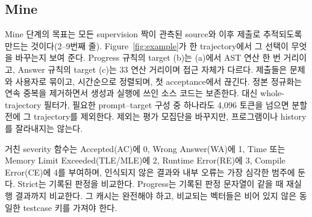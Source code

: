 \documentclass[10pt,conference]{IEEEtran}
\begin{document}
\subsection{Mine}
\label{sec:mine}

Mine 단계의 목표는 모든 supervision 짝이 관측된 source와 이후 제출로 추적되도록 만드는 것이다(2--9번째 줄). Figure~\ref{fig:example}가 한 trajectory에서 그 선택이 무엇을 바꾸는지 보여 준다. Progress 규칙의 target (b)는 (a)에서 AST 연산 한 번 거리이고, Answer 규칙의 target (c)는 33 연산 거리이며 접근 자체가 다르다. 제출들은 문제와 사용자로 묶이고, 시간순으로 정렬되며, 첫 acceptance에서 끊긴다. 정본 정규화는 연속 중복을 제거하면서 생성과 실행에 쓰인 소스 코드는 보존한다. 대신 whole-trajectory 필터가, 필요한 prompt--target 구성 중 하나라도 4,096 토큰을 넘으면 분할 전에 그 trajectory를 제외한다. 제외는 평가 모집단을 바꾸지만, 프로그램이나 history를 잘라내지는 않는다.

거친 severity 함수는 Accepted(AC)에 0, Wrong Answer(WA)에 1, Time 또는 Memory Limit Exceeded(TLE/MLE)에 2, Runtime Error(RE)에 3, Compile Error(CE)에 4를 부여하며, 인식되지 않은 결과와 내부 오류는 가장 심각한 범주에 둔다. Strict는 기록된 판정을 비교한다. Progress는 기록된 판정 문자열이 같을 때 재실행 결과까지 비교한다. 그 캐시는 완전해야 하고, 비교되는 벡터들은 비어 있지 않은 동일한 testcase 키를 가져야 한다.
\end{document}
